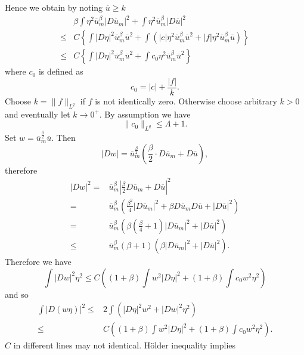 Hence we obtain by noting $\overline{u}\ge k$
\begin{align*}
  &\beta\int \eta^2\overline{u}_m^{\beta}\left| D\overline{u}_m \right| ^2+\int\eta^2\overline{u}_m^{\beta}\left| D\overline{u} \right| ^2\\
  \le & C\left\{ \int\left| D\eta \right| ^2\overline{u}_m^{\beta}\overline{u}^2+\int\left( \left| c \right| \eta^2\overline{u}_m^{\beta}\overline{u}^2+\left| f \right| \eta^2\overline{u}_m^{\beta}\overline{u} \right)  \right\}\\
  \le & C\left\{ \int\left| D\eta \right| ^2\overline{u}_m^{\beta}\overline{u}^2+\int c_0\eta^2\overline{u}_m^{\beta}\overline{u}^2 \right\} 
\end{align*}
where $c_0$ is defined as 
\[
  c_0=\left| c \right| +\frac{\left| f \right| }{k}.
\] 
Choose $k=\|f\|_{L^{q}}$ if $f$ is not identically zero. Otherwise choose arbitrary $k>0$ and eventually let $k\to 0^{+}$. 
By assumption we have 
\[
\|c_0\|_{L^{q}}\le \Lambda +1.
\] 
Set $w=\overline{u}_m^{\frac{\beta}{2}}\overline{u}$. Then 
\[
  \left| Dw \right| =\overline{u}_m^{\frac{\beta}{2}}\left( \frac{\beta}{2}\cdot D\overline{u}_m+D\overline{u} \right) ,
\] 
therefore
\begin{align*}
  \left| Dw \right| ^2=&\overline{u}_m^{\beta}\left| \frac{\beta}{2}D\overline{u}_m+D\overline{u} \right| ^2\\
  =& \overline{u}_m^{\beta}\left( \frac{\beta^2}{4}\left| D\overline{u}_m \right| ^2+\beta D\overline{u}_mD\overline{u}+\left| D\overline{u} \right| ^2 \right) \\
  =& \overline{u}_m^{\beta}\left( \beta\left( \frac{\beta}{4}+1 \right) \left| D\overline{u}_m \right| ^2+\left| D\overline{u} \right| ^2 \right) \\
  \le & \overline{u}_m^{\beta}\left( \beta+1 \right) \left( \beta \left| D\overline{u}_m \right| ^2+\left| D\overline{u} \right| ^2 \right) 
.\end{align*}
Therefore we have 
\[
  \int\left| Dw \right| ^2\eta^2\le  C\left( (1+\beta)\int w^2\left| D\eta \right| ^2+(1+\beta)\int c_0w^2\eta^2 \right) 
\] 
and so
\begin{align*}
  \int \left| D(w\eta) \right| ^2\le & 2\int\left( \left| D\eta \right| ^2w^2+\left| Dw \right| ^2\eta^2 \right) \\
  \le  & C \left( (1+\beta)\int w^2 \left| D\eta \right| ^2+\left( 1+\beta \right) \int c_0w^2\eta^2 \right) .
\end{align*}
 $C$ in different lines may not identical. H\"{o}lder inequality implies 
